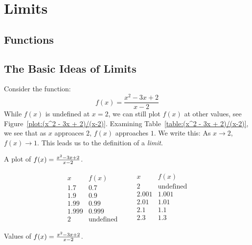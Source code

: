 \chapter{Limits}

\section{Functions}{}{}



\section{The Basic Ideas of Limits}{}{}

Consider the function:
\[
f(x) = \frac{x^2 - 3x + 2}{x-2}
\]
While $f(x)$ is undefined at $x=2$, we can still plot $f(x)$ at other
values, see Figure~\ref{plot:(x^2 - 3x + 2)/(x-2)}. Examining
Table~\ref{table:(x^2 - 3x + 2)/(x-2)}, we see that as $x$ approaces
$2$, $f(x)$ approaches $1$. We write this: As $x \to 2$, $f(x) \to 1$.
This leads us to the definition of a \textit{limit}.


\begin{marginfigure}
\caption{A plot of $f(x)=\protect\frac{x^2 - 3x + 2}{x-2}$.}
\label{plot:(x^2 - 3x + 2)/(x-2)}
\end{marginfigure}

\begin{margintable}
\[
\begin{array}{c|c}
 x & f(x) \\ \hline
 1.7 &  0.7 \\
 1.9 &  0.9 \\
 1.99 &  0.99 \\
 1.999 &  0.999 \\
  2 &  \text{undefined}
\end{array}\qquad
\begin{array}{c|c}
 x & f(x) \\ \hline
  2 & \text{undefined}\\
 2.001&  1.001\\
 2.01&  1.01\\
 2.1 &  1.1 \\
 2.3 &  1.3 \\
\end{array}
\]
\caption{Values of $f(x)=\protect\frac{x^2 - 3x + 2}{x-2}$.}
\label{table:(x^2 - 3x + 2)/(x-2)}
\end{margintable}



